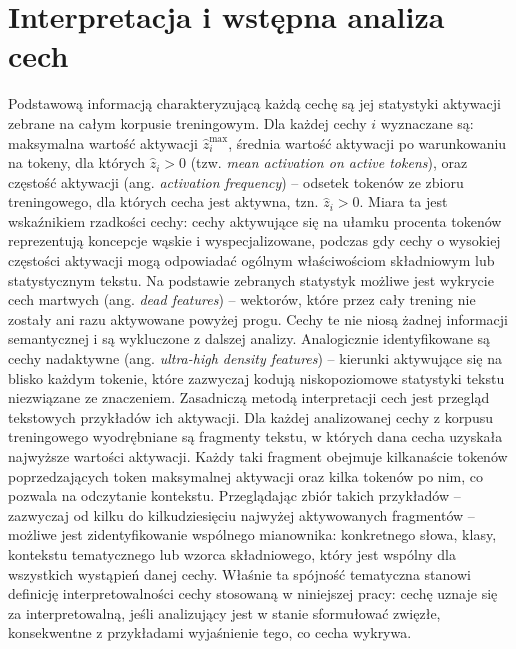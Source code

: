 \section{Interpretacja i wstępna analiza cech}
\label{sec:interpretacja_cech}
Podstawową informacją charakteryzującą każdą cechę są jej statystyki aktywacji zebrane na całym korpusie treningowym. Dla każdej cechy $i$ wyznaczane są: maksymalna wartość aktywacji $\hat{z}_i^{\max}$, średnia wartość aktywacji po warunkowaniu na tokeny, dla których $\hat{z}_i > 0$ (tzw. \textit{mean activation on active tokens}), oraz częstość aktywacji (ang. \textit{activation frequency}) -- odsetek tokenów ze zbioru treningowego, dla których cecha jest aktywna, tzn. $\hat{z}_i > 0$. Miara ta jest wskaźnikiem rzadkości cechy: cechy aktywujące się na ułamku procenta tokenów reprezentują koncepcje wąskie i wyspecjalizowane, podczas gdy cechy o wysokiej częstości aktywacji mogą odpowiadać ogólnym właściwościom składniowym lub statystycznym tekstu. \newline
Na podstawie zebranych statystyk możliwe jest wykrycie cech martwych (ang. \textit{dead features}) -- wektorów, które przez cały trening nie zostały ani razu aktywowane powyżej progu. Cechy te nie niosą żadnej informacji semantycznej i są wykluczone z dalszej analizy. Analogicznie identyfikowane są cechy nadaktywne (ang. \textit{ultra-high density features}) -- kierunki aktywujące się na blisko każdym tokenie, które zazwyczaj kodują niskopoziomowe statystyki tekstu niezwiązane ze znaczeniem. \newline
Zasadniczą metodą interpretacji cech jest przegląd tekstowych przykładów ich aktywacji. Dla każdej analizowanej cechy z korpusu treningowego wyodrębniane są fragmenty tekstu, w których dana cecha uzyskała najwyższe wartości aktywacji. Każdy taki fragment obejmuje kilkanaście tokenów poprzedzających token maksymalnej aktywacji oraz kilka tokenów po nim, co pozwala na odczytanie kontekstu. \newline
Przeglądając zbiór takich przykładów -- zazwyczaj od kilku do kilkudziesięciu najwyżej aktywowanych fragmentów -- możliwe jest zidentyfikowanie wspólnego mianownika: konkretnego słowa, klasy, kontekstu tematycznego lub wzorca składniowego, który jest wspólny dla wszystkich wystąpień danej cechy. Właśnie ta spójność tematyczna stanowi definicję interpretowalności cechy stosowaną w niniejszej pracy: cechę uznaje się za interpretowalną, jeśli analizujący jest w stanie sformułować zwięzłe, konsekwentne z przykładami wyjaśnienie tego, co cecha wykrywa. \newline
